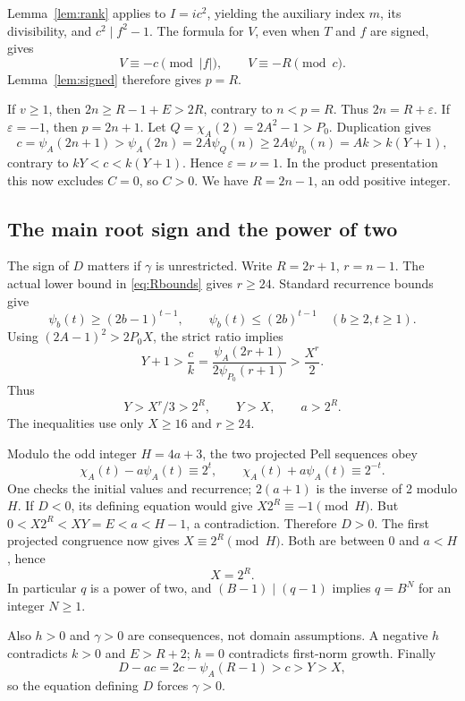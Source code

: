 \documentclass[11pt,a4paper]{article}
\theoremstyle{definition}\newtheorem{definition}[theorem]{Definition}
\theoremstyle{remark}\newtheorem{remark}[theorem]{Remark}
\begin{document}
Lemma~\ref{lem:rank} applies to \(I=ic^2\), yielding the auxiliary
index \(m\), its divisibility, and \(c^2\mid f^2-1\).
The formula for \(V\), even when \(T\) and \(f\) are signed, gives
\[
 V\equiv-c\pmod{|f|},\qquad V\equiv-R\pmod c.
\]
Lemma~\ref{lem:signed} therefore gives \(p=R\).

If \(v\ge1\), then \(2n\ge R-1+E>2R\), contrary to \(n<p=R\).
Thus \(2n=R+\varepsilon\). If \(\varepsilon=-1\), then
\(p=2n+1\). Let \(Q=\chi_A(2)=2A^2-1>P_0\). Duplication gives
\[
 c=\psi_A(2n+1)>\psi_A(2n)
  =2A\psi_Q(n)\ge2A\psi_{P_0}(n)=Ak>k(Y+1),
\]
contrary to \(kY<c<k(Y+1)\). Hence \(\varepsilon=\nu=1\).
In the product presentation this now excludes \(C=0\), so \(C>0\).
We have \(R=2n-1\), an odd positive integer.

\subsection{The main root sign and the power of two}

The sign of \(D\) matters if \(\gamma\) is unrestricted. Write
\(R=2r+1\), \(r=n-1\). The actual lower bound in
\eqref{eq:Rbounds} gives \(r\ge24\). Standard recurrence bounds give
\[
 \psi_b(t)\ge(2b-1)^{t-1},\qquad
 \psi_b(t)\le(2b)^{t-1}\quad(b\ge2,t\ge1).
\]
Using \((2A-1)^2>2P_0X\), the strict ratio implies
\[
 Y+1>\frac{c}{k}
 =\frac{\psi_A(2r+1)}{2\psi_{P_0}(r+1)}>\frac{X^r}{2}.
\]
Thus
\begin{equation}\label{eq:Ylarge}
 Y>X^r/3>2^R,\qquad Y>X,\qquad a>2^R.
\end{equation}
The inequalities use only \(X\ge16\) and \(r\ge24\).

Modulo the odd integer \(H=4a+3\), the two projected Pell sequences
obey
\[
 \chi_A(t)-a\psi_A(t)\equiv2^t,
 \qquad\chi_A(t)+a\psi_A(t)\equiv2^{-t}.
\]
One checks the initial values and recurrence; \(2(a+1)\) is the
inverse of 2 modulo \(H\). If \(D<0\), its defining equation
would give \(X2^R\equiv-1\pmod H\). But
\(0<X2^R<XY=E<a<H-1\), a contradiction. Therefore \(D>0\).
The first projected congruence now gives \(X\equiv2^R\pmod H\).
Both are between 0 and \(a<H\), hence
\begin{equation}\boxed{X=2^R.}\label{eq:power}\end{equation}
In particular \(q\) is a power of two, and \((B-1)\mid(q-1)\)
implies \(q=B^N\) for an integer \(N\ge1\).

Also \(h>0\) and \(\gamma>0\) are consequences, not domain
assumptions. A negative \(h\) contradicts \(k>0\) and
\(E>R+2\); \(h=0\) contradicts first-norm growth. Finally
\[
 D-ac=2c-\psi_A(R-1)>c>Y>X,
\]
so the equation defining \(D\) forces \(\gamma>0\).
\end{document}
